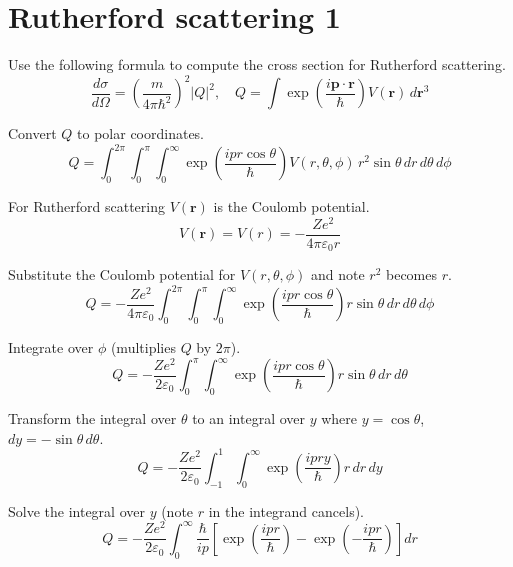 


\section*{Rutherford scattering 1}

Use the following formula to compute the cross section for Rutherford scattering.
\begin{equation*}
\frac{d\sigma}{d\Omega}=\left(\frac{m}{4\pi\hbar^2}\right)^2|Q|^2,\quad
Q=\int\exp\left(\frac{i\mathbf p\cdot\mathbf r}{\hbar}\right)V(\mathbf r)\,d\mathbf r^3
\end{equation*}

Convert $Q$ to polar coordinates.
\begin{equation*}
Q=\int_0^{2\pi}
\int_0^\pi
\int_0^\infty
\exp\left(\frac{ipr\cos\theta}{\hbar}\right)V(r,\theta,\phi)
\,r^2\sin\theta\,dr\,d\theta\,d\phi
\end{equation*}

For Rutherford scattering $V(\mathbf r)$ is the Coulomb potential.
\begin{equation*}
V(\mathbf r)=V(r)=-\frac{Ze^2}{4\pi\varepsilon_0r}
\end{equation*}

Substitute the Coulomb potential for $V(r,\theta,\phi)$ and note $r^2$ becomes $r$.
\begin{equation*}
Q=-\frac{Ze^2}{4\pi\varepsilon_0}
\int_0^{2\pi}
\int_0^\pi
\int_0^\infty
\exp\left(\frac{ipr\cos\theta}{\hbar}\right)
r\sin\theta\,dr\,d\theta\,d\phi
\end{equation*}

Integrate over $\phi$ (multiplies $Q$ by $2\pi$).
\begin{equation*}
Q=-\frac{Ze^2}{2\varepsilon_0}
\int_0^\pi
\int_0^\infty
\exp\left(\frac{ipr\cos\theta}{\hbar}\right)
r\sin\theta\,dr\,d\theta
\end{equation*}

Transform the integral over $\theta$ to an integral over $y$
where $y=\cos\theta$, $dy=-\sin\theta\,d\theta$.
\begin{equation*}
Q=-\frac{Ze^2}{2\varepsilon_0}
\int_{-1}^1
\int_0^\infty
\exp\left(\frac{ipry}{\hbar}\right)
r\,dr\,dy
\end{equation*}

Solve the integral over $y$ (note $r$ in the integrand cancels).
\begin{equation*}
Q=-\frac{Ze^2}{2\varepsilon_0}
\int_0^\infty
\frac{\hbar}{ip}
\left[\exp\left(\frac{ipr}{\hbar}\right)-\exp\left(-\frac{ipr}{\hbar}\right)\right]
dr
\end{equation*}

